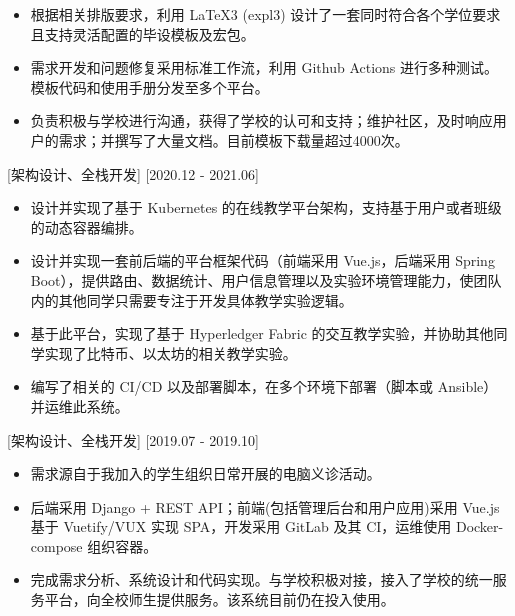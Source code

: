 \documentclass{resume}
\begin{document}
\begin{itemize}
  \item 根据相关排版要求，利用 LaTeX3 (expl3) 设计了一套同时符合各个学位要求且支持灵活配置的毕设模板及宏包。
  \item 需求开发和问题修复采用标准工作流，利用 Github Actions 进行多种测试。模板代码和使用手册分发至多个平台。
  \item 负责积极与学校进行沟通，获得了学校的认可和支持；维护社区，及时响应用户的需求；并撰写了大量文档。目前模板下载量超过4000次。
\end{itemize}


[架构设计、全栈开发]
[2020.12 - 2021.06] 

\begin{itemize}
  \item 设计并实现了基于 Kubernetes 的在线教学平台架构，支持基于用户或者班级的动态容器编排。
  \item 设计并实现一套前后端的平台框架代码（前端采用 Vue.js，后端采用 Spring Boot），提供路由、数据统计、用户信息管理以及实验环境管理能力，使团队内的其他同学只需要专注于开发具体教学实验逻辑。
  \item 基于此平台，实现了基于 Hyperledger Fabric 的交互教学实验，并协助其他同学实现了比特币、以太坊的相关教学实验。
  \item 编写了相关的 CI/CD 以及部署脚本，在多个环境下部署（脚本或 Ansible）并运维此系统。
\end{itemize}

[架构设计、全栈开发]
[2019.07 - 2019.10] 

\begin{itemize}
  \item 需求源自于我加入的学生组织日常开展的电脑义诊活动。
  \item 后端采用 Django + REST API；前端(包括管理后台和用户应用)采用 Vue.js 基于 Vuetify/VUX 实现 SPA，开发采用 GitLab 及其 CI，运维使用 Docker-compose 组织容器。
  \item 完成需求分析、系统设计和代码实现。与学校积极对接，接入了学校的统一服务平台，向全校师生提供服务。该系统目前仍在投入使用。
\end{itemize}
\end{document}

